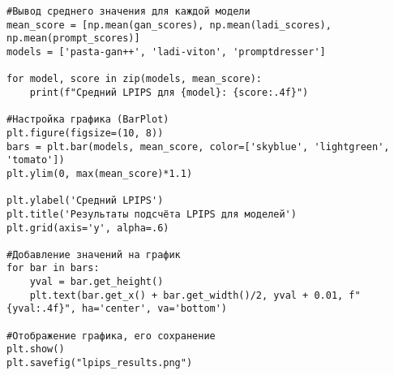 \begin{verbatim}
#Вывод среднего значения для каждой модели
mean_score = [np.mean(gan_scores), np.mean(ladi_scores), np.mean(prompt_scores)]
models = ['pasta-gan++', 'ladi-viton', 'promptdresser']

for model, score in zip(models, mean_score):
    print(f"Средний LPIPS для {model}: {score:.4f}")

#Настройка графика (BarPlot)
plt.figure(figsize=(10, 8))
bars = plt.bar(models, mean_score, color=['skyblue', 'lightgreen', 'tomato'])
plt.ylim(0, max(mean_score)*1.1)

plt.ylabel('Средний LPIPS')
plt.title('Результаты подсчёта LPIPS для моделей')
plt.grid(axis='y', alpha=.6)

#Добавление значений на график
for bar in bars:
    yval = bar.get_height()
    plt.text(bar.get_x() + bar.get_width()/2, yval + 0.01, f"{yval:.4f}", ha='center', va='bottom')

#Отображение графика, его сохранение
plt.show()
plt.savefig("lpips_results.png")
\end{verbatim}